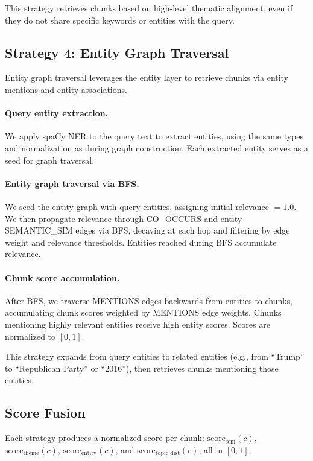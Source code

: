 \documentclass[10pt]{article}
\begin{document}
This strategy retrieves chunks based on high-level thematic alignment, even if they do not share specific keywords or entities with the query.

\subsection{Strategy 4: Entity Graph Traversal}

Entity graph traversal leverages the entity layer to retrieve chunks via entity mentions and entity associations.

\paragraph{Query entity extraction.} We apply spaCy NER to the query text to extract entities, using the same types and normalization as during graph construction. Each extracted entity serves as a seed for graph traversal.

\paragraph{Entity graph traversal via BFS.} We seed the entity graph with query entities, assigning initial relevance $=1.0$. We then propagate relevance through CO\_OCCURS and entity SEMANTIC\_SIM edges via BFS, decaying at each hop and filtering by edge weight and relevance thresholds. Entities reached during BFS accumulate relevance.

\paragraph{Chunk score accumulation.} After BFS, we traverse MENTIONS edges backwards from entities to chunks, accumulating chunk scores weighted by MENTIONS edge weights. Chunks mentioning highly relevant entities receive high entity scores. Scores are normalized to $[0,1]$.

This strategy expands from query entities to related entities (e.g., from ``Trump'' to ``Republican Party'' or ``2016''), then retrieves chunks mentioning those entities.

\subsection{Score Fusion}

Each strategy produces a normalized score per chunk: $\text{score}_{\text{sem}}(c)$, $\text{score}_{\text{theme}}(c)$, $\text{score}_{\text{entity}}(c)$, and $\text{score}_{\text{topic\_dist}}(c)$, all in $[0,1]$.
\end{document}
